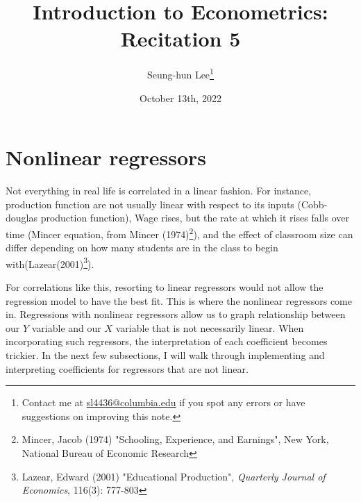 \documentclass[12pt]{article}
\title{Introduction to Econometrics: Recitation 5}
\theoremstyle{definition}
\theoremstyle{property}
\theoremstyle{assumption}
\theoremstyle{example}
\theoremstyle{comment}
\begin{document}
\linespread{1.25}
\onehalfspacing

\author{Seung-hun Lee\footnote{Contact me at \href{mailto:sl4436@columbia.edu}{sl4436@columbia.edu} if you spot any errors or have suggestions on improving this note.}}
\date{October 13th, 2022}
\maketitle
\thispagestyle{firstpage}


\section{Nonlinear regressors}
Not everything in real life is correlated in a linear fashion. For instance, production function are not usually linear with respect to its inputs (Cobb-douglas production function), Wage rises, but the rate at which it rises falls over time (Mincer equation, from Mincer (1974)\footnote{\scriptsize{Mincer, Jacob (1974) "Schooling, Experience, and Earnings", New York, National Bureau of Economic Research}}), and the effect of classroom size can differ depending on how many students are in the class to begin with(Lazear(2001)\footnote{\scriptsize{Lazear, Edward (2001) "Educational Production", \textit{Quarterly Journal of Economics}, 116(3): 777-803}}). \par\medskip
For correlations like this, resorting to linear regressors would not allow the regression model to have the best fit. This is where the nonlinear regressors come in. Regressions with nonlinear regressors allow us to graph relationship between our $Y$ variable and our $X$ variable that is not necessarily linear. When incorporating such regressors, the interpretation of each coefficient becomes trickier. In the next few subsections, I will walk through implementing and interpreting coefficients for regressors that are not linear. \par\medskip
\end{document}
